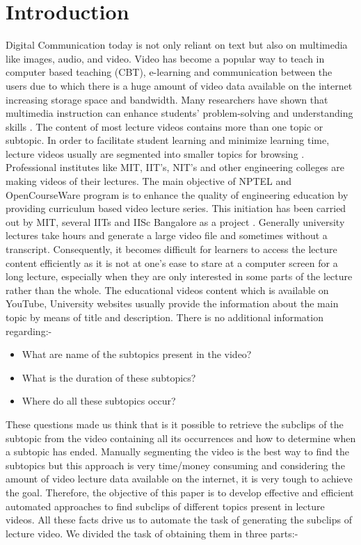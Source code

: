 \documentclass[conference]{IEEEtran}
\begin{document}
\section{Introduction}
Digital Communication today is not only reliant on text but also on multimedia like images, audio, and video. Video has become a popular way to teach in computer based teaching (CBT), e-learning and communication between the users due to which there is a huge amount of video data available on the internet increasing storage space and bandwidth. Many researchers have shown that multimedia instruction can enhance students’ problem-solving and understanding skills \cite{b1}. The content of most lecture videos contains more than one topic or subtopic. In order to facilitate student learning and minimize learning time, lecture videos usually are segmented into smaller topics for browsing \cite{b2}.\\ Professional institutes like MIT, IIT’s, NIT’s and other engineering colleges are making videos of their lectures. The main objective of NPTEL and OpenCourseWare program is to enhance the quality of engineering education by providing curriculum based video lecture series. This initiation has been carried out by MIT, several IITs and IISc Bangalore as a project \cite{b3}. Generally university lectures take hours and generate a large video file and sometimes without a transcript. Consequently, it becomes difficult for learners to access the lecture content efficiently as it is not at one’s ease to stare at a computer screen for a long lecture, especially when they are only interested in some parts of the lecture rather than the whole. The educational videos content which is available on YouTube, University websites usually provide the information about the main topic by means of title and description. There is no additional information regarding:-
\begin{itemize}
	\item What are name of the subtopics present in the video?
	\item What is the duration of these subtopics?
	\item Where do all these subtopics occur?
\end{itemize}

These questions made us think that is it possible to retrieve the subclips of the subtopic from the video containing all its occurrences and how to determine when a subtopic has ended. Manually segmenting the video is the best way to find the subtopics but this approach is very time/money consuming and considering the amount of video lecture data available on the internet, it is very tough to achieve the goal. Therefore, the objective of this paper is to develop effective and efficient automated approaches to find subclips of different topics present in lecture videos. All these facts drive us to automate the task of generating the subclips of lecture video. We divided the task of obtaining them in three
parts:-
\end{document}
